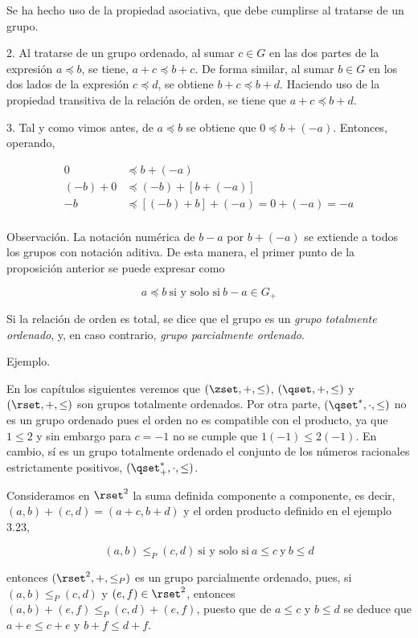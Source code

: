 \noindent Se ha hecho uso de la propiedad asociativa, que debe cumplirse al
tratarse de un grupo.

2. Al tratarse de un grupo ordenado, al sumar $c \in G$ en las dos partes de
la expresión $a \preceq b$, se tiene, $a + c \preceq b + c$. De forma
similar, al sumar $b \in G$ en los dos lados de la expresión $c \preceq d$,
se obtiene $b + c \preceq b + d$. Haciendo uso de la propiedad transitiva de
la relación de orden, se tiene que $a + c \preceq b + d$.

3. Tal y como vimos antes, de $a \preceq b$ se obtiene que $0 \preceq b +
({-a})$. Entonces, operando,

\begin{align*}
  0 &\preceq b + ({-a}) \\
  ({-b}) + 0 &\preceq ({-b}) + [b + ({-a})] \\
  {-b} &\preceq [({-b}) + b] + ({-a}) = 0 + ({-a}) = {-a} \\
\end{align*}

Observación. La notación numérica de $b - a$ por $b + ({-a})$ se extiende a
todos los grupos con notación aditiva. De esta manera, el primer punto de la
proposición anterior se puede expresar como

$$ a \preceq b \ \text{si y solo si} \ b - a \in G_+ $$

Si la relación de orden es total, se dice que el grupo es un \emph{grupo
totalmente ordenado}, y, en caso contrario, \emph{grupo parcialmente
ordenado}.

Ejemplo.

En los capítulos siguientes veremos que $(\zset, +, \leq)$, $(\qset, +,
\leq)$ y $(\rset, +, \leq)$ son grupos totalmente ordenados. Por otra parte,
$(\qset^*, \cdot, \leq)$ no es un grupo ordenado pues el orden no es
compatible con el producto, ya que $1 \leq 2$ y sin embargo para $c = {-1}$
no se cumple que $1({-1}) \leq 2({-1})$. En cambio, sí es un grupo
totalmente ordenado el conjunto de los números racionales estrictamente
positivos, $(\qset_+^*, \cdot, \leq)$.

Consideramos en $\rset^2$ la suma definida componente a componente, es
decir, $(a,b) + (c,d) = (a + c, b + d)$ y el orden producto definido en el
ejemplo 3.23,

$$ (a, b) \leq_P (c, d) \ \text{si y solo si} \ a \leq c \ \text{y} \ b \leq
d $$


\noindent entonces $(\rset^2, +, \leq_P)$ es un grupo parcialmente ordenado,
pues, si $(a, b) \leq_P (c, d)$ y $(e, f) \in \rset^2$, entonces $(a, b) +
(e, f) \leq_P (c, d) + (e, f)$, puesto que de $a \leq c$ y $b \leq d$ se
deduce que $a + e \leq c + e$ y $b + f \leq d + f$.

